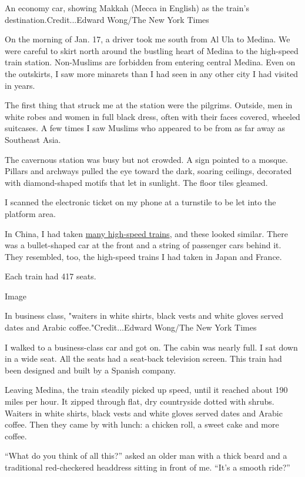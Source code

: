An economy car, showing Makkah (Mecca in English) as the train's
destination.Credit...Edward Wong/The New York Times

On the morning of Jan. 17, a driver took me south from Al Ula to Medina.
We were careful to skirt north around the bustling heart of Medina to
the high-speed train station. Non-Muslims are forbidden from entering
central Medina. Even on the outskirts, I saw more minarets than I had
seen in any other city I had visited in years.

The first thing that struck me at the station were the pilgrims.
Outside, men in white robes and women in full black dress, often with
their faces covered, wheeled suitcases. A few times I saw Muslims who
appeared to be from as far away as Southeast Asia.

The cavernous station was busy but not crowded. A sign pointed to a
mosque. Pillars and archways pulled the eye toward the dark, soaring
ceilings, decorated with diamond-shaped motifs that let in sunlight. The
floor tiles gleamed.

I scanned the electronic ticket on my phone at a turnstile to be let
into the platform area.

In China, I had taken
\href{https://www.nytimes.com/2011/06/23/business/global/23rail.html}{many
high-speed trains}, and these looked similar. There was a bullet-shaped
car at the front and a string of passenger cars behind it. They
resembled, too, the high-speed trains I had taken in Japan and France.

Each train had 417 seats.

Image

In business class, "waiters in white shirts, black vests and white
gloves served dates and Arabic coffee."Credit...Edward Wong/The New York
Times

I walked to a business-class car and got on. The cabin was nearly full.
I sat down in a wide seat. All the seats had a seat-back television
screen. This train had been designed and built by a Spanish company.

Leaving Medina, the train steadily picked up speed, until it reached
about 190 miles per hour. It zipped through flat, dry countryside dotted
with shrubs. Waiters in white shirts, black vests and white gloves
served dates and Arabic coffee. Then they came by with lunch: a chicken
roll, a sweet cake and more coffee.

``What do you think of all this?'' asked an older man with a thick beard
and a traditional red-checkered headdress sitting in front of me. ``It's
a smooth ride?''


